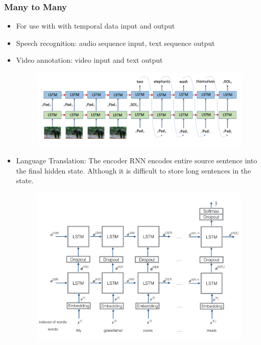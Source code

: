 \subsubsection{Many to Many}
\begin{itemize}
    \item For use with with temporal data input and output
    \item Speech recognition: audio sequence input, text sequence output
    \item Video annotation: video input and text output
    \begin{figure}[H]
        \centering
        \includegraphics[width=0.75\linewidth]{img/vid_annotation.png}
    \end{figure}
    \item Language Translation: The encoder RNN encodes entire source sentence into the final hidden state. Although it is difficult to store long sentences in the state.
    \begin{figure}[H]
        \centering
        \includegraphics[width=0.75\linewidth]{img/translate.png}

    \end{figure}

    
\end{itemize}

